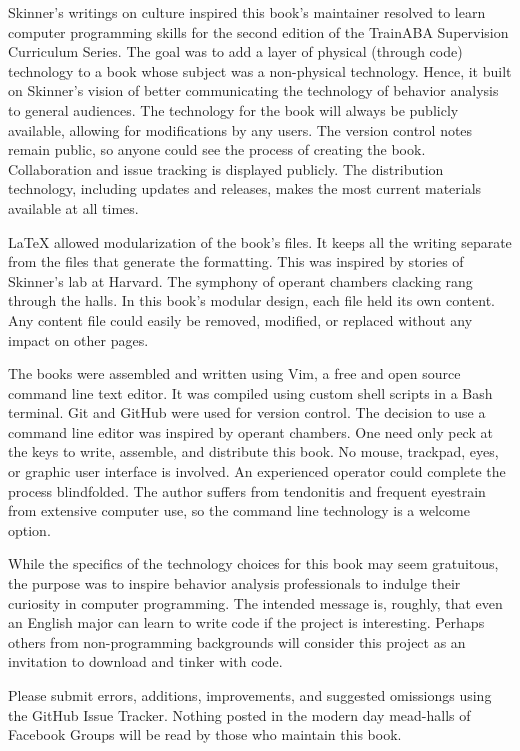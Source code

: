 Skinner's writings on culture inspired this book's maintainer resolved to learn computer programming skills for the second edition of the TrainABA Supervision Curriculum Series. The goal was to add a layer of physical (through code) technology to a book whose subject was a non-physical technology. Hence, it built on Skinner's vision of better communicating the technology of behavior analysis to general audiences. The technology for the book will always be publicly available, allowing for modifications by any users. The version control notes remain public, so anyone could see the process of creating the book. Collaboration and issue tracking is displayed publicly. The distribution technology, including updates and releases, makes the most current materials available at all times.

\LaTeX{} allowed modularization of the book's files. It keeps all the writing separate from the files that generate the formatting. This was inspired by stories of Skinner's lab at Harvard. The symphony of operant chambers clacking rang through the halls. In this book's modular design, each file held its own content. Any content file could easily be removed, modified, or replaced without any impact on other pages.


The books were assembled and written using Vim, a free and open source command line text editor. It was compiled using custom shell scripts in a Bash terminal. Git and GitHub were used for version control. The decision to use a command line editor was inspired by operant chambers. One need only peck at the keys to write, assemble, and distribute this book. No mouse, trackpad, eyes, or graphic user interface is involved. An experienced operator could complete the process blindfolded. The author suffers from tendonitis and frequent eyestrain from extensive computer use, so the command line technology is a welcome option.


While the specifics of the technology choices for this book may seem gratuitous, the purpose was to inspire behavior analysis professionals to indulge their curiosity in computer programming. The intended message is, roughly, that even an English major can learn to write code if the project is interesting. Perhaps others from non-programming backgrounds will consider this project as an invitation to download and tinker with code.

Please submit errors, additions, improvements, and suggested omissiongs using the GitHub Issue Tracker. Nothing posted in the modern day mead-halls of Facebook Groups will be read by those who maintain this book.

